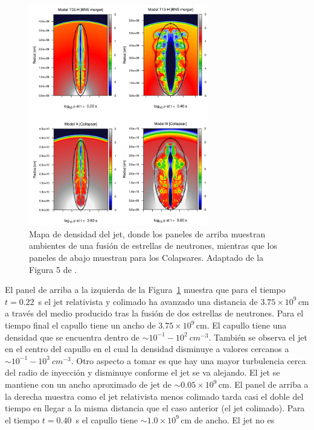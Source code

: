 \documentclass[12pt,a4paper]{book}
\begin{document}
\begin{figure} 
  \centering
    \includegraphics[width=0.7\textwidth]{Figuras/capitulo_1/jet_models.png}
  \caption{Mapa de densidad del jet, donde los paneles de arriba muestran ambientes de una fusión de estrellas de neutrones, mientras que los paneles de abajo muestran para los Colapsares. Adaptado de la Figura 5 de
  \citet{JBEMGRB}.}
  \label{fig:jet_models}
\end{figure}
El panel de arriba a la izquierda de la Figura~\ref{fig:jet_models} muestra que para el tiempo $t = 0.22$~s el jet relativista y colimado ha avanzado una distancia de $3.75 \times 10^9 \, \text{cm}$ a través 
del medio producido tras la fusión de dos estrellas de neutrones. Para el tiempo final el capullo tiene un ancho de $3.75 \times 10^9 \, \text{cm}$. El capullo tiene una densidad que se encuentra dentro 
de $\sim10^{-1}-10^{2} ~cm^{-3}$. También se observa el jet en el centro del capullo en el cual la densidad disminuye a valores cercanos a $\sim 10^{-1}-10^{3} ~cm^{-3}$. Otro aspecto a tomar es que hay una mayor 
turbulencia cerca del radio de 
inyección y disminuye conforme el jet se va alejando. El jet se mantiene con un ancho aproximado de jet de $\sim 0.05 \times 10^9 \, \text{cm}$. El panel de arriba a la derecha muestra como el jet relativista menos 
colimado tarda casi el doble del tiempo en llegar a la misma distancia que el caso anterior (el jet colimado). Para el tiempo $t = 0.40$~s el capullo tiene $\sim 1.0 \times 10^9 \, \text{cm}$ de ancho. El jet no es 
\end{document}
